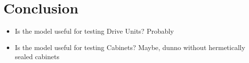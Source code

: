 
\chapter{Conclusion}
\label{chap:conclusion}
\begin{itemize}
	\item Is the model useful for testing Drive Units? Probably
	\item Is the model useful for testing Cabinets? Maybe, dunno without hermetically sealed cabinets
\end{itemize}

\FloatBarrier